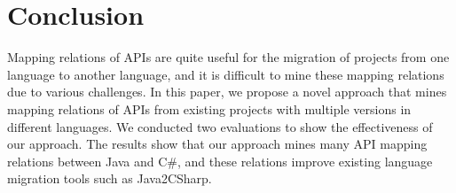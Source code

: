 \section{Conclusion}
\label{sec:conclusion}

Mapping relations of APIs are quite useful for the migration
of projects from one language to another language, and
it is difficult to mine these mapping relations due to various
challenges. In this paper, we propose a novel approach that mines mapping
relations of APIs from existing projects with multiple versions in
different languages. We conducted two evaluations to show the effectiveness
of our approach. The results show that our approach mines many API mapping
relations between Java and C\#, and these relations improve existing language
migration tools such as Java2CSharp.
